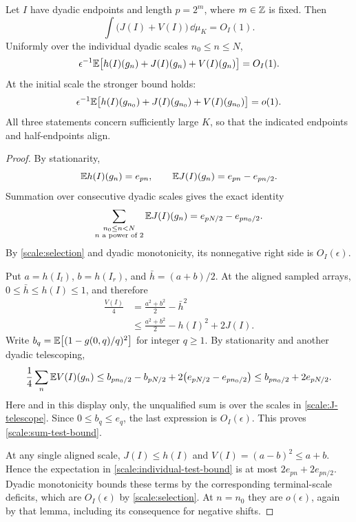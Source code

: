 \begin{lemma}\label{scale:local-mass}
Let $I$ have dyadic endpoints and length $p=2^m$, where $m\in\mathbb{Z}$ is
fixed. Then
\begin{equation}\label{scale:sum-test-bound}
 \int\bigl(J(I)+V(I)\bigr)\,\dd\mu_K=O_I(1).
\end{equation}
Uniformly over the individual dyadic scales $n_0\le n\le N$,
\begin{equation}\label{scale:individual-test-bound}
 \epsilon^{-1}\mathbb{E}\bigl[h(I)(g_n)+J(I)(g_n)+V(I)(g_n)\bigr]
 =O_I(1).
\end{equation}
At the initial scale the stronger bound holds:
\begin{equation}\label{scale:initial-test-bound}
 \epsilon^{-1}\mathbb{E}\bigl[h(I)(g_{n_0})+J(I)(g_{n_0})
                         +V(I)(g_{n_0})\bigr]=o(1).
\end{equation}
All three statements concern sufficiently large $K$, so that the
indicated endpoints and half-endpoints align.
\end{lemma}

\begin{proof}
By stationarity,
\[
 \mathbb{E} h(I)(g_n)=e_{pn},\qquad
 \mathbb{E} J(I)(g_n)=e_{pn}-e_{pn/2}.
\]
Summation over consecutive dyadic scales gives the exact identity
\begin{equation}\label{scale:J-telescope}
 \sum_{\substack{n_0\le n<N\\n\text{ a power of }2}}
       \mathbb{E} J(I)(g_n)=e_{pN/2}-e_{pn_0/2}.
\end{equation}
By \cref{scale:selection} and dyadic monotonicity, its nonnegative
right side is $O_I(\epsilon)$.

Put $a=h(I_l)$, $b=h(I_r)$, and $\bar h=(a+b)/2$. At the aligned
sampled arrays, $0\le\bar h\le h(I)\le1$, and therefore
\begin{align*}
 \frac{V(I)}4
 &=\frac{a^2+b^2}{2}-\bar h^2\\
 &\le\frac{a^2+b^2}{2}-h(I)^2+2J(I).
\end{align*}
Write $b_q=\mathbb{E}\bigl[(1-g(0,q)/q)^2\bigr]$ for integer $q\ge1$.
By stationarity and another dyadic telescoping,
\[
 \frac14\sum_n\mathbb{E} V(I)(g_n)
 \le b_{pn_0/2}-b_{pN/2}
      +2\bigl(e_{pN/2}-e_{pn_0/2}\bigr)
 \le b_{pn_0/2}+2e_{pN/2}.
\]
Here and in this display only, the unqualified sum is over the scales
in \cref{scale:J-telescope}. Since $0\le b_q\le e_q$, the last
expression is $O_I(\epsilon)$. This proves
\cref{scale:sum-test-bound}.

At any single aligned scale, $J(I)\le h(I)$ and
$V(I)=(a-b)^2\le a+b$. Hence the expectation in
\cref{scale:individual-test-bound} is at most
$2e_{pn}+2e_{pn/2}$. Dyadic monotonicity bounds these terms by the
corresponding terminal-scale deficits, which are $O_I(\epsilon)$
by \cref{scale:selection}. At $n=n_0$ they are $o(\epsilon)$,
again by that lemma, including its consequence for negative shifts.
\end{proof}

